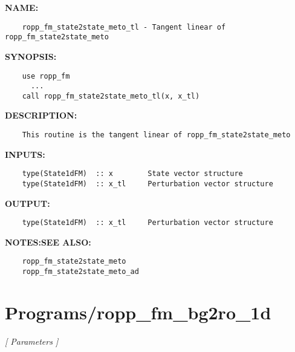 \label{ch:robo63}
\label{ch:Model_meto_ropp_fm_state2state_meto_tl}
\textbf{NAME:}\hspace{0.08in}\begin{Verbatim}
    ropp_fm_state2state_meto_tl - Tangent linear of ropp_fm_state2state_meto
\end{Verbatim}
\textbf{SYNOPSIS:}\hspace{0.08in}\begin{Verbatim}
    use ropp_fm
      ...
    call ropp_fm_state2state_meto_tl(x, x_tl)
\end{Verbatim}
\textbf{DESCRIPTION:}\hspace{0.08in}\begin{Verbatim}
    This routine is the tangent linear of ropp_fm_state2state_meto
\end{Verbatim}
\textbf{INPUTS:}\hspace{0.08in}\begin{Verbatim}
    type(State1dFM)  :: x        State vector structure
    type(State1dFM)  :: x_tl     Perturbation vector structure
\end{Verbatim}
\textbf{OUTPUT:}\hspace{0.08in}\begin{Verbatim}
    type(State1dFM)  :: x_tl     Perturbation vector structure
\end{Verbatim}
\textbf{NOTES:}\hspace{0.08in}\textbf{SEE ALSO:}\hspace{0.08in}\begin{Verbatim}
    ropp_fm_state2state_meto
    ropp_fm_state2state_meto_ad
\end{Verbatim}
\section{Programs/ropp\_fm\_bg2ro\_1d}
\textsl{[ Parameters ]}

